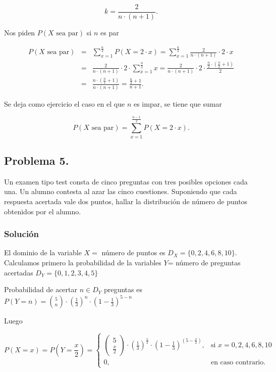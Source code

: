 \documentclass[
]{article}
\begin{document}
\[k= \frac{2}{n\cdot (n+1)}.\]

Nos piden \(P(X\mbox{ sea par})\) si \(n\) es par

\begin{eqnarray*}
P(X\mbox{ sea par})&=&\sum_{x=1}^{\frac{n}{2}} P(X=2\cdot x)=
\sum_{x=1}^{\frac{n}{2}}  \frac{2}{n\cdot (n+1)}\cdot 2\cdot x\\
&=& \frac{2}{n\cdot (n+1)}\cdot2 \cdot  \sum_{x=1}^{\frac{n}{2}} x=
\frac{2}{n\cdot (n+1)}\cdot2 \cdot  \frac{\frac{n}{2}\cdot (\frac{n}{2}+1)}{2}\\
&=& \frac{n\cdot (\frac{n}{2}+1)}{n\cdot(n+1)}=
\frac{\frac{n}{2}+1}{n+1}.
\end{eqnarray*}

Se deja como ejercicio el caso en el que \(n\) es impar, se tiene que
sumar

\[
P(X\mbox{ sea par})=\sum_{x=1}^{\frac{n-1}{2}} P(X=2\cdot x).
\]

\subsection{Problema 5.}\label{problema-5.}

Un examen tipo test consta de cinco preguntas con tres posibles opciones
cada una. Un alumno contesta al azar las cinco cuestiones. Suponiendo
que cada respuesta acertada vale dos puntos, hallar la distribución de
número de puntos obtenidos por el alumno.

\subsubsection{Solución}\label{soluciuxf3n-4}

El dominio de la variable \(X=\) número de puntos es
\(D_X=\{0,2,4,6,8,10\}\). Calculamos primero la probabilidad de la
variables \(Y\)= número de preguntas acertadas \(D_Y=\{0,1,2,3,4,5\}\)

Probabilidad de acertar \(n\in D_Y\) preguntas es
\(P(Y=n)={5 \choose n}\cdot \left(\frac13\right)^n\cdot \left(1-\frac13\right)^{5-n}\)

Luego

\[
P(X=x)=P\left(Y=\frac{x}{2}\right)=\begin{cases}
\left(\begin{array}{c}5\\\frac{x}{2}\end{array}\right)\cdot \left(\frac13\right)^\frac{x}{2}\cdot \left(1-\frac13\right)^{\left(5-\frac{x}{2}\right)}, & \mbox{si }x=0,2,4,6,8,10 \\
0, & \mbox{en caso contrario.}
\end{cases}
\]
\end{document}
